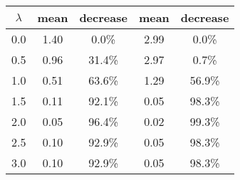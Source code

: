 \begin{tabular}{c||c|c||c|c}
\toprule
 $\lambda$ &  mean & decrease &  mean & decrease \\
\midrule
       0.0 &  1.40 &    0.0\% &  2.99 &    0.0\% \\
       0.5 &  0.96 &   31.4\% &  2.97 &    0.7\% \\
       1.0 &  0.51 &   63.6\% &  1.29 &   56.9\% \\
       1.5 &  0.11 &   92.1\% &  0.05 &   98.3\% \\
       2.0 &  0.05 &   96.4\% &  0.02 &   99.3\% \\
       2.5 &  0.10 &   92.9\% &  0.05 &   98.3\% \\
       3.0 &  0.10 &   92.9\% &  0.05 &   98.3\% \\
\bottomrule
\end{tabular}

